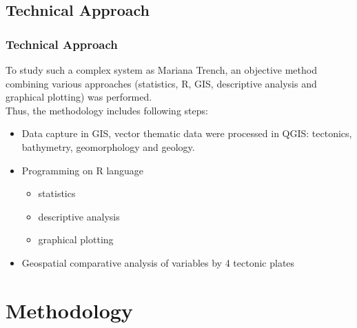 \documentclass[pdflatex,compress,10pt,
	xcolor={dvipsnames,dvipsnames,svgnames,x11names,table},
	hyperref={colorlinks = true,breaklinks = true, urlcolor = NavyBlue, breaklinks = true}]{beamer}
\begin{document}
\subsection{Technical Approach}
\begin{frame}\frametitle{Technical Approach}
To study such a complex system as Mariana Trench, an objective method combining various approaches (statistics, R, GIS, descriptive analysis and graphical plotting) was performed. \\Thus, the methodology includes following steps:
\begin{itemize}
    \item Data capture in GIS, vector thematic data were processed in QGIS: tectonics, bathymetry, geomorphology and geology.
    \item Programming on R language
      \begin{itemize}
            \item statistics
            \item descriptive analysis 
            \item graphical plotting  
        \end{itemize}
      \item Geospatial comparative analysis of variables by 4 tectonic plates
\end{itemize}
\end{frame}


\section{Methodology}
\end{document}
